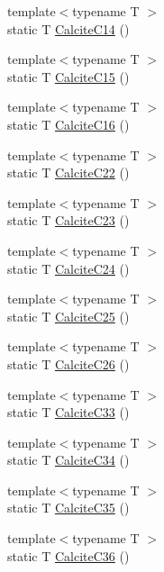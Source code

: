 \begin{DoxyCompactItemize}
{\footnotesize template$<$typename T $>$ }\\static T \mbox{\hyperlink{namespacempc_1_1data_a31115e5f7f561369f25f8c5bedd07d53}{Calcite\+C14}} ()
\item 
{\footnotesize template$<$typename T $>$ }\\static T \mbox{\hyperlink{namespacempc_1_1data_a744474e954f79985c9cab1cdece87124}{Calcite\+C15}} ()
\item 
{\footnotesize template$<$typename T $>$ }\\static T \mbox{\hyperlink{namespacempc_1_1data_acb7947ab48e961a18a0c2ea2bba66004}{Calcite\+C16}} ()
\item 
{\footnotesize template$<$typename T $>$ }\\static T \mbox{\hyperlink{namespacempc_1_1data_a8a6080282f5e9ee5ef7fd6797cf137f4}{Calcite\+C22}} ()
\item 
{\footnotesize template$<$typename T $>$ }\\static T \mbox{\hyperlink{namespacempc_1_1data_a235390ea020759b17d1277dd49abf30b}{Calcite\+C23}} ()
\item 
{\footnotesize template$<$typename T $>$ }\\static T \mbox{\hyperlink{namespacempc_1_1data_a3e353500a1f0d816709880721b6204de}{Calcite\+C24}} ()
\item 
{\footnotesize template$<$typename T $>$ }\\static T \mbox{\hyperlink{namespacempc_1_1data_ada42e7ec70af036bc9d942dd517223df}{Calcite\+C25}} ()
\item 
{\footnotesize template$<$typename T $>$ }\\static T \mbox{\hyperlink{namespacempc_1_1data_aa2b680629c194da9673465454808e9cb}{Calcite\+C26}} ()
\item 
{\footnotesize template$<$typename T $>$ }\\static T \mbox{\hyperlink{namespacempc_1_1data_a83bb9a48779b21f4d063928cc218fce6}{Calcite\+C33}} ()
\item 
{\footnotesize template$<$typename T $>$ }\\static T \mbox{\hyperlink{namespacempc_1_1data_af5b18800a581d138b2b32d05ff8acd35}{Calcite\+C34}} ()
\item 
{\footnotesize template$<$typename T $>$ }\\static T \mbox{\hyperlink{namespacempc_1_1data_a31298cef33b1d5d22758a42bdaa1062c}{Calcite\+C35}} ()
\item 
{\footnotesize template$<$typename T $>$ }\\static T \mbox{\hyperlink{namespacempc_1_1data_a1f8106f756de7273c5997f148f738481}{Calcite\+C36}} ()

\end{DoxyCompactItemize}
